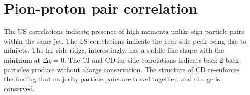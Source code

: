 \documentclass[12pt,a4paper,twoside]{report}
\begin{document}
\section{Pion-proton pair correlation}
The US correlations indicate presence of high-momenta unlike-sign particle pairs within the same jet. The LS correlations indicate the near-side peak being due to minijets. The far-side ridge, interestingly, has a saddle-like shape with the minimum at $\Delta\eta=0$. The CI and CD far-side correlations indicate back-2-back particles produce without charge conservation. The structure of CD re-enforces the finding that majority particle pairs are travel together, and charge is conserved.


\end{document}
